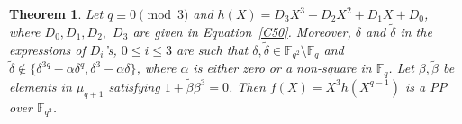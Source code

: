 \documentclass[12pt]{amsart}
\newtheorem{thm}{Theorem}[section]
\numberwithin{equation}{section}
\theoremstyle{definition}
\newcommand{\F}{\mathbb F}
\begin{document}
\begin{thm}\label{T50} Let $q\equiv 0 \pmod 3$ and $h(X)=D_3X^3+D_2X^2 +D_1X+D_0$, where $D_0, D_1, D_2,$ $D_3$ are given in Equation~\eqref{C50}. Moreover, $\delta$ and $\tilde \delta$ in the expressions of $D_i$'s, $0 \leq i \leq 3$ are such that $\delta, \tilde \delta \in \F_{q^2}\setminus\F_{q}$ and $\tilde \delta \not \in \{ \delta^{3q}-\alpha \delta^q, \delta^3-\alpha \delta\}$, where $\alpha$ is either zero or a non-square in $\F_q$.
Let $\beta, {\tilde \beta}$ be elements in $\mu_{q+1}$ satisfying $1+{\tilde \beta}\beta^3=0$.
Then $f(X)=X^3h(X^{q-1})$ is a PP over $\F_{q^2}$.
\end{thm}
\end{document}
